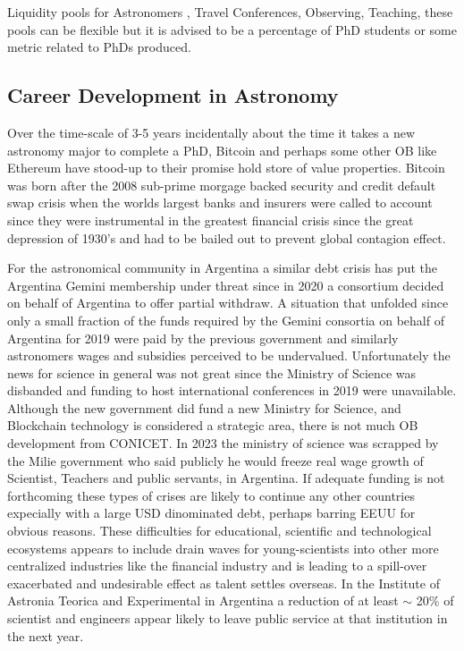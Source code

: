 \documentclass[final,5p,times,twocolumn,authoryear]{elsarticle}
\begin{document}
Liquidity pools for Astronomers , Travel Conferences, Observing, Teaching, these pools can be flexible but it is advised to be a percentage of PhD  students or some metric related to PhDs produced. 

\subsection{Career Development in Astronomy}

Over the time-scale of 3-5 years incidentally about the time it takes a new astronomy major to complete a PhD, Bitcoin and perhaps some other OB like Ethereum have stood-up to their promise hold store of value properties. Bitcoin was born after the 2008 sub-prime morgage backed security and credit default swap crisis when the worlds largest banks and insurers were called to account since they were instrumental in the greatest financial crisis since the great depression of 1930's and had to be bailed out to prevent global contagion effect.
 
For the astronomical community in Argentina a similar debt crisis has put the Argentina Gemini membership under threat since in 2020 a consortium decided on behalf of Argentina to offer partial withdraw. A situation that unfolded since only a small fraction of the funds required by the Gemini consortia on behalf of Argentina for 2019 were paid by the previous government and similarly astronomers wages and subsidies perceived to be undervalued. Unfortunately the news for science in general was not great since the Ministry of Science was disbanded and funding to host international conferences in 2019 were unavailable. Although the new government did fund a new Ministry for Science, and Blockchain technology is considered a strategic area, there is not much OB development from CONICET. In 2023 the ministry of science was scrapped by the Milie government who said publicly he would freeze real wage growth of Scientist, Teachers and public servants, in Argentina. If adequate funding is not forthcoming these types of crises are likely to continue any other countries expecially with a large USD dinominated debt, perhaps barring EEUU for obvious reasons. These difficulties for educational, scientific and technological ecosystems appears to include drain waves for young-scientists into other more centralized industries like the financial industry and is leading to a spill-over exacerbated and undesirable effect as talent settles overseas. In the Institute of Astronia Teorica and Experimental in Argentina a reduction of at least $\sim$ 20\% of scientist and engineers appear likely to leave public service at that institution in the next year.
\end{document}
